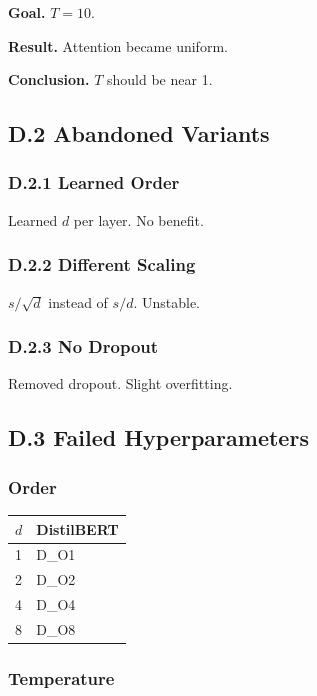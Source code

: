 \textbf{Goal.} $T = 10$.

\textbf{Result.} Attention became uniform.

\textbf{Conclusion.} $T$ should be near 1.

\subsection{D.2 Abandoned Variants}

\subsubsection{D.2.1 Learned Order}

Learned $d$ per layer. No benefit.

\subsubsection{D.2.2 Different Scaling}

$s / \sqrt{d}$ instead of $s / d$. Unstable.

\subsubsection{D.2.3 No Dropout}

Removed dropout. Slight overfitting.

\subsection{D.3 Failed Hyperparameters}

\subsubsection{Order}

\begin{table}[H]
\centering
\small
\begin{tabular}{ll}
\toprule
\textbf{$d$} & \textbf{DistilBERT} \\
\midrule
1 & {{D\_O1}} \\
2 & {{D\_O2}} \\
4 & {{D\_O4}} \\
8 & {{D\_O8}} \\
\bottomrule
\end{tabular}
\end{table}

\subsubsection{Temperature}

